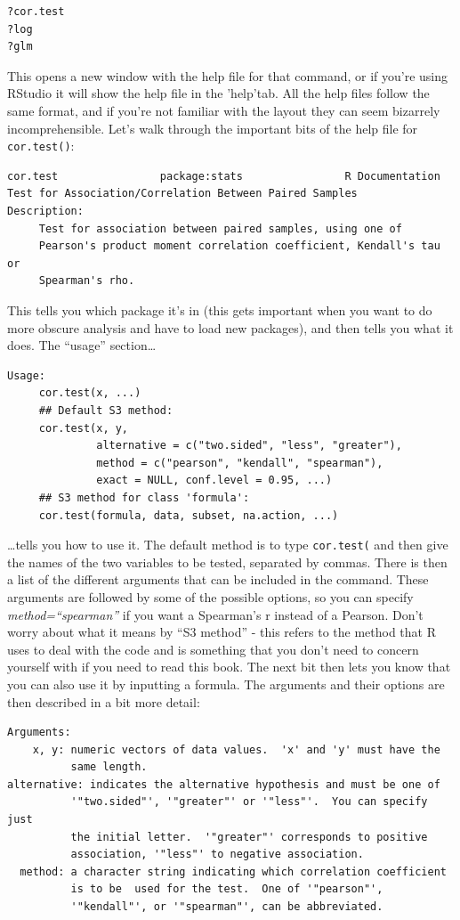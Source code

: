 \documentclass[
]{book}
\begin{document}
\begin{verbatim}
?cor.test
?log
?glm
\end{verbatim}

This opens a new window with the help file for that command, or if you're using RStudio it will show the help file in the 'help'tab. All the help files follow the same format, and if you're not familiar with the layout they can seem bizarrely incomprehensible. Let's walk through the important bits of the help file for \texttt{cor.test()}:

\begin{verbatim}
cor.test                package:stats                R Documentation
Test for Association/Correlation Between Paired Samples
Description:
     Test for association between paired samples, using one of
     Pearson's product moment correlation coefficient, Kendall's tau or
     Spearman's rho.
\end{verbatim}

This tells you which package it's in (this gets important when you want to do more obscure analysis and have to load new packages), and then tells you what it does. The ``usage'' section\ldots{}

\begin{verbatim}
Usage:
     cor.test(x, ...)
     ## Default S3 method:
     cor.test(x, y,
              alternative = c("two.sided", "less", "greater"),
              method = c("pearson", "kendall", "spearman"),
              exact = NULL, conf.level = 0.95, ...)
     ## S3 method for class 'formula':
     cor.test(formula, data, subset, na.action, ...)
\end{verbatim}

\ldots tells you how to use it. The default method is to type \texttt{cor.test(} and then give the names of the two variables to be tested, separated by commas. There is then a list of the different arguments that can be included in the command. These arguments are followed by some of the possible options, so you can specify \emph{method=``spearman''} if you want a Spearman's r instead of a Pearson. Don't worry about what it means by ``S3 method'' - this refers to the method that R uses to deal with the code and is something that you don't need to concern yourself with if you need to read this book. The next bit then lets you know that you can also use it by inputting a formula. The arguments and their options are then described in a bit more detail:

\begin{verbatim}
Arguments:
    x, y: numeric vectors of data values.  'x' and 'y' must have the
          same length.
alternative: indicates the alternative hypothesis and must be one of
          '"two.sided"', '"greater"' or '"less"'.  You can specify just
          the initial letter.  '"greater"' corresponds to positive
          association, '"less"' to negative association.
  method: a character string indicating which correlation coefficient
          is to be  used for the test.  One of '"pearson"',
          '"kendall"', or '"spearman"', can be abbreviated.
\end{verbatim}
\end{document}
